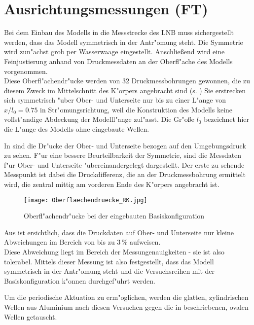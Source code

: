 \section{Ausrichtungsmessungen (FT)}
\label{s:Vorueberlegungen}
Bei dem Einbau des Modells in die Messstrecke des LNB muss sichergestellt werden, dass das Modell symmetrisch in der Antr"omung steht. Die Symmetrie wird zun"achst grob per Wasserwaage eingestellt. Anschlie\ss{}end wird eine Feinjustierung anhand von Druckmessdaten an der Oberfl"ache des Modells vorgenommen.\\
Diese Oberfl"achendr"ucke werden von 32 Druckmessbohrungen gewonnen, die zu diesem Zweck im Mittelschnitt des K"orpers angebracht sind (s. )
Sie erstrecken sich symmetrisch "uber Ober- und Unterseite nur bis zu einer L"ange von $x/l_{0} = 0.75$ in Str"omungsrichtung, weil die Konstruktion des Modells keine vollst"andige Abdeckung der Modelll"ange zul"asst.
Die Gr"o\ss{}e $l_0$ bezeichnet hier die L"ange des Modells ohne eingebaute Wellen.

In  sind die Dr"ucke der Ober- und Unterseite bezogen auf den Umgebungsdruck zu sehen.
F"ur eine bessere Beurteilbarkeit der Symmetrie, sind die Messdaten f"ur Ober- und Unterseite "ubereinandergelegt dargestellt. Der erste zu sehende Messpunkt ist dabei die Druckdifferenz, die an der Druckmessbohrung ermittelt wird, die zentral mittig am vorderen Ende des K"orpers angebracht ist.

\begin{figure}[h]
	\centering
	\texttt{[image: Oberflaechendruecke\_RK.jpg]}
	\caption{Oberfl"achendr"ucke bei der eingebauten Basiskonfiguration}
	\label{fig:Oberflaechendruckverteilung RK}
\end{figure}

Aus  ist ersichtlich, dass die Druckdaten auf Ober- und Unterseite nur kleine Abweichungen im Bereich von bis zu 3\,\% aufweisen.\\
Diese Abweichung liegt im Bereich der Messungenauigkeiten - sie ist also tolerabel.
Mittels dieser Messung ist also festgestellt, dass das Modell symmetrisch in der Antr"omung steht und die Versuchsreihen mit der Basiskonfiguration k"onnen durchgef"uhrt werden.

Um die periodische Aktuation zu erm"oglichen, werden die glatten, zylindrischen Wellen aus Aluminium nach diesen Versuchen gegen die in  beschriebenen, ovalen Wellen getauscht.

